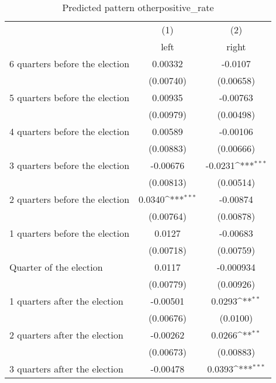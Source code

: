 \begin{table}[htbp]\centering
\def\sym#1{\ifmmode^{#1}\else\(^{#1}\)\fi}
\caption{Predicted pattern otherpositive\_rate}
\begin{tabular}{l*{2}{c}}
\hline\hline
                    &\multicolumn{1}{c}{(1)}&\multicolumn{1}{c}{(2)}\\
                    &\multicolumn{1}{c}{left}&\multicolumn{1}{c}{right}\\
\hline
 6 quarters before the election&     0.00332         &     -0.0107         \\
                    &   (0.00740)         &   (0.00658)         \\
[1em]
 5 quarters before the election&     0.00935         &    -0.00763         \\
                    &   (0.00979)         &   (0.00498)         \\
[1em]
 4 quarters before the election&     0.00589         &    -0.00106         \\
                    &   (0.00883)         &   (0.00666)         \\
[1em]
 3 quarters before the election&    -0.00676         &     -0.0231\sym{***}\\
                    &   (0.00813)         &   (0.00514)         \\
[1em]
 2 quarters before the election&      0.0340\sym{***}&    -0.00874         \\
                    &   (0.00764)         &   (0.00878)         \\
[1em]
 1 quarters before the election&      0.0127         &    -0.00683         \\
                    &   (0.00718)         &   (0.00759)         \\
[1em]
Quarter of the election&      0.0117         &   -0.000934         \\
                    &   (0.00779)         &   (0.00926)         \\
[1em]
 1 quarters after the election&    -0.00501         &      0.0293\sym{**} \\
                    &   (0.00676)         &    (0.0100)         \\
[1em]
 2 quarters after the election&    -0.00262         &      0.0266\sym{**} \\
                    &   (0.00673)         &   (0.00883)         \\
[1em]
 3 quarters after the election&    -0.00478         &      0.0393\sym{***}\\

\end{tabular}
\end{table}
